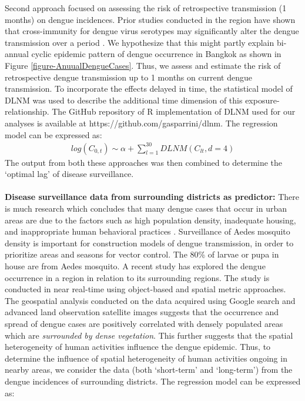 \documentclass{bmcart}
\begin{document}
Second approach focused on assessing the risk of retrospective transmission (1 months) on dengue incidences. Prior studies conducted in the region have shown that cross-immunity for dengue virus serotypes may significantly alter the dengue transmission over a period \cite{adams2006cross,reich2013interactions}. We hypothesize that this might partly explain bi-annual cyclic epidemic pattern of dengue occurrence in Bangkok as shown in Figure \ref{figure-AnuualDengueCases}. Thus, we assess and estimate the risk of retrospective dengue transmission up to 1 months on current dengue transmission. To incorporate the effects delayed in time, the statistical model of DLNM was used to describe the additional time dimension of this exposure-relationship\cite{gasparrini2010distributed}. The GitHub repository of R implementation of DLNM used for our analyses is available at https://github.com/gasparrini/dlnm. The regression model can be expressed as:
\begin{equation}
\begin{aligned}
\label{eq:long}
log (C_{0,t}) \sim \alpha + \sum_{l=1}^{30} DLNM(C_ {lt}, d = 4) 
\end{aligned}
\end{equation}
The output from both these approaches was then combined to determine the `optimal lag' of disease surveillance. \\\\
\textbf{Disease surveillance data from surrounding districts as predictor:} There is much research which concludes that many dengue cases that occur in urban areas are due to the factors such as high population density, inadequate housing, and inappropriate human behavioral practices \cite{chang2009combining,knudsen1992vector,troyo2009urban}.  Surveillance of Aedes mosquito density is important for construction models of dengue transmission, in order to prioritize areas and seasons for vector control. The 80\% of larvae or pupa in house are from Aedes mosquito. A recent study \cite{sarfraz2014near} has explored the dengue occurrence in a region in relation to its surrounding regions. The study is conducted in near real-time using object-based and spatial metric approaches. The geospatial analysis conducted on the data acquired using Google search and advanced land observation satellite images suggests that the occurrence and spread of dengue cases are positively correlated with densely populated areas which are \textit{surrounded by dense vegetation}. This further suggests that the spatial heterogeneity of human activities influence the dengue epidemic. Thus, to determine the influence of spatial heterogeneity of human activities ongoing in nearby areas, we consider the data (both `short-term' and `long-term') from the dengue incidences of surrounding districts. The regression model can be expressed as:
\end{document}
